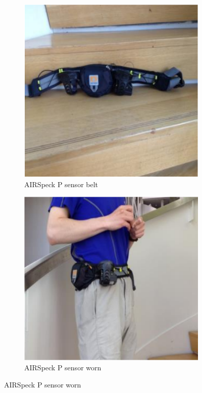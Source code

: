 \begin{figure}[H]
\medskip


\begin{subfigure}{0.48\textwidth}
\includegraphics[width=\linewidth]{images/AIRSpeckP.png}
\caption{AIRSpeck P sensor belt \cite{estimation_dosage}} \label{fig:c}
\end{subfigure}
\begin{subfigure}{0.48\textwidth}
\includegraphics[width=\linewidth]{images/AIRSpeck_P_worn.png}
\caption{AIRSpeck P sensor worn \cite{estimation_dosage}} \label{fig:d}
\end{subfigure}


\end{figure}
